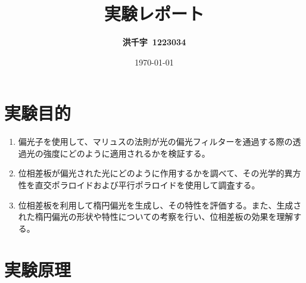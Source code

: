 \documentclass{article}
\title{\textbf{実験レポート}} %
\author{\textbf{洪千宇\ 1223034}}
\date{\today}
\begin{document}

\section{実験目的}
\begin{enumerate}[label=\arabic*), before=\begin{spacing}{1}, after=\end{spacing}] %
    \item 偏光子を使用して、マリュスの法則が光の偏光フィルターを通過する際の透過光の強度にどのように適用されるかを検証する。
    \item 位相差板が偏光された光にどのように作用するかを調べて、その光学的異方性を直交ポラロイドおよび平行ポラロイドを使用して調査する。
    \item 位相差板を利用して楕円偏光を生成し、その特性を評価する。また、生成された楕円偏光の形状や特性についての考察を行い、位相差板の効果を理解する。
\end{enumerate}

\section{実験原理}
\end{document}
